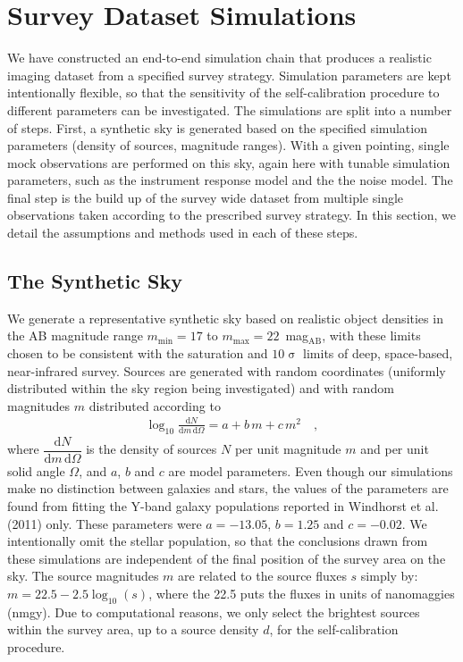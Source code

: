 \documentclass[manuscript]{aastex}
\newcommand{\dd}{\text{d}}
\begin{document}
\section{Survey Dataset Simulations}
\label{sec:survey_simulations}
We have constructed an end-to-end simulation chain that produces a realistic imaging dataset from a specified survey strategy. Simulation parameters are kept intentionally flexible, so that the sensitivity of the self-calibration procedure to different parameters can be investigated. The simulations are split into a number of steps. First, a synthetic sky is generated based on the specified simulation parameters (density of sources, magnitude ranges). With a given pointing, single mock observations are performed on this sky, again here with tunable simulation parameters, such as the instrument response model and the the noise model. The final step is the build up of the survey wide dataset from multiple single observations taken according to the prescribed survey strategy. In this section, we detail the assumptions and methods used in each of these steps. 

\subsection{The Synthetic Sky}
We generate a representative synthetic sky based on realistic object densities in the AB magnitude range $m_\text{min} = 17$ to $m_\text{max} = 22$~mag$_\text{AB}$, with these limits chosen to be consistent with the saturation and $10\upsigma{}$ limits of deep, space-based, near-infrared survey. Sources are generated with random coordinates (uniformly distributed within the sky region being investigated) and with random magnitudes $m$ distributed according to
\begin{eqnarray}
\log_{10} \frac{\dd N}{\dd m \, \dd \Omega} = a + b\,m + c\,m^2 \label{eqn:power_law} \quad , 
\end{eqnarray}
where $\dfrac{\dd N}{\dd m \, \dd  \Omega}$  is the density of sources $N$ per unit magnitude $m$ and per unit solid angle $\Omega$, and $a$, $b$ and $c$ are model parameters. Even though our simulations make no distinction between galaxies and stars, the values of the parameters are found from fitting the Y-band galaxy populations reported in Windhorst et al. (2011) \citep{win11} only. These parameters were $a = -13.05$, $b = 1.25$ and $c = -0.02$. We intentionally omit the stellar population, so that the conclusions drawn from these simulations are independent of the final position of the survey area on the sky. The source magnitudes $m$ are related to the source fluxes $s$ simply by: $m = 22.5 - 2.5\log_{10}(s)$, where the 22.5 puts the fluxes in units of nanomaggies (nmgy). Due to computational reasons, we only select the brightest sources within the survey area, up to a source density $d$, for the self-calibration procedure.
\end{document}
